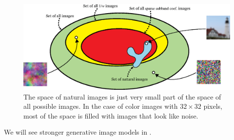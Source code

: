 \begin{figure}
\centerline{
\includegraphics[width=1\linewidth]{figures/statistical_image_models/spaces_real_images_and_models_final.eps}
} 
\caption{The space of natural images is just very small part of the space of all possible images. In the case of color images with $32\times32$ pixels, most of the space is filled with images that look like noise.} 
\label{fig:spaces_real_images_final}
\end{figure}

We will see stronger generative image models in \chap{\ref{chapter:generative_models}}.

